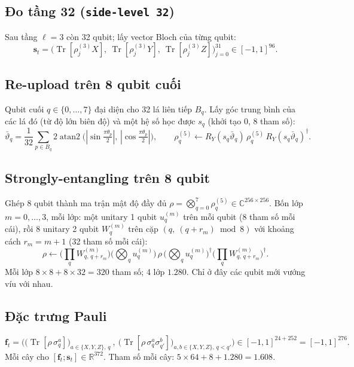 \documentclass[11pt,a4paper]{article}
\newcommand{\RR}{\mathbb{R}}
\newcommand{\CC}{\mathbb{C}}
\newcommand{\Tr}{\operatorname{Tr}}
\begin{document}
\subsection{Đo tầng 32 (\texttt{side-level 32})}
Sau tầng $\ell=3$ còn 32 qubit; lấy vector Bloch của từng qubit:
\begin{equation}
\bm s_t = \big(\Tr[\rho^{(3)}_j X],\ \Tr[\rho^{(3)}_j Y],\ \Tr[\rho^{(3)}_j Z]\big)_{j=0}^{31} \in [-1,1]^{96}.
\end{equation}

\subsection{Re-upload trên 8 qubit cuối}
Qubit cuối $q\in\{0,\dots,7\}$ đại diện cho 32 lá liên tiếp $B_q$. Lấy góc trung bình của các lá đó
(từ độ lớn biên độ) và một hệ số học được $s_q$ (khởi tạo 0, 8 tham số):
\begin{equation}
\bar\vartheta_q = \frac{1}{32}\sum_{p\in B_q} 2\operatorname{atan2}\big(|\sin\tfrac{\pi\theta_p}{2}|,\,|\cos\tfrac{\pi\theta_p}{2}|\big),
\qquad
\rho^{(5)}_q \leftarrow R_Y(s_q\bar\vartheta_q)\,\rho^{(5)}_q\,R_Y(s_q\bar\vartheta_q)^\dagger .
\end{equation}

\subsection{Strongly-entangling trên 8 qubit}
Ghép 8 qubit thành ma trận mật độ đầy đủ $\rho = \bigotimes_{q=0}^{7}\rho^{(5)}_q \in \CC^{256\times256}$.
Bốn lớp $m=0,\dots,3$, mỗi lớp: một unitary 1 qubit $u^{(m)}_q$ trên mỗi qubit (8 tham số mỗi cái), rồi 8 unitary
2 qubit $W^{(m)}_q$ trên cặp $(q,\ (q+r_m)\bmod 8)$ với khoảng cách $r_m = m+1$ (32 tham số mỗi cái):
\begin{equation}
\rho \leftarrow \Big(\prod_{q} W^{(m)}_{q,\,q+r_m}\Big)\Big(\bigotimes_q u^{(m)}_q\Big)\,\rho\,
\Big(\bigotimes_q u^{(m)}_q\Big)^\dagger\Big(\prod_{q} W^{(m)}_{q,\,q+r_m}\Big)^\dagger .
\end{equation}
Mỗi lớp $8\times8+8\times32=320$ tham số; 4 lớp $1.280$. Chỉ ở đây các qubit mới vướng víu với nhau.

\subsection{Đặc trưng Pauli}
\begin{equation}
\bm f_t = \Big( \big(\Tr[\rho\,\sigma^a_q]\big)_{a\in\{X,Y,Z\},\,q}\ ,\ \big(\Tr[\rho\,\sigma^a_q\sigma^b_{q'}]\big)_{a,b\in\{X,Y,Z\},\,q<q'} \Big)
\in [-1,1]^{24+252} = [-1,1]^{276}.
\end{equation}
Mỗi cây cho $[\bm f_t;\bm s_t]\in\RR^{372}$. Tham số mỗi cây: $5\times64 + 8 + 1.280 = 1.608$.
\end{document}
